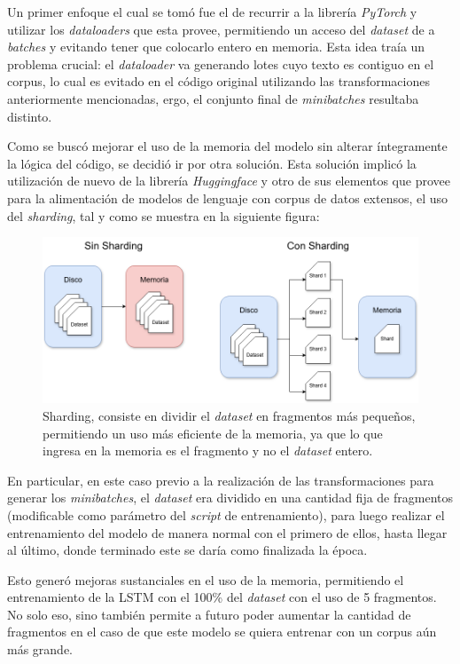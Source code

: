 Un primer enfoque el cual se tomó fue el de recurrir a la librería \textit{PyTorch} y utilizar los \textit{dataloaders} que esta provee, permitiendo un acceso del \textit{dataset} de a \textit{batches} y evitando tener que colocarlo entero en memoria. Esta idea traía un problema crucial: el \textit{dataloader} va generando lotes cuyo texto es contiguo en el corpus, lo cual es evitado en el código original utilizando las transformaciones anteriormente mencionadas, ergo, el conjunto final de \textit{minibatches} resultaba distinto.

Como se buscó mejorar el uso de la memoria del modelo sin alterar íntegramente la lógica del código, se decidió ir por otra solución. Esta solución implicó la utilización de nuevo de la librería \textit{Huggingface} y otro de sus elementos que provee para la alimentación de modelos de lenguaje con corpus de datos extensos, el uso del \textit{sharding}, tal y como se muestra en la siguiente figura:

\begin{figure}[H]
    \centering
    \includegraphics[width=1\textwidth]{imagenes/sharding.png}
    \caption{Sharding, consiste en dividir el \textit{dataset} en fragmentos más pequeños, permitiendo un uso más eficiente de la memoria, ya que lo que ingresa en la memoria es el fragmento y no el \textit{dataset} entero.}
    \label{fig:sharding}
\end{figure}

En particular, en este caso previo a la realización de las transformaciones para generar los \textit{minibatches}, el \textit{dataset} era dividido en una cantidad fija de fragmentos (modificable como parámetro del \textit{script} de entrenamiento), para luego realizar el entrenamiento del modelo de manera normal con el primero de ellos, hasta llegar al último, donde terminado este se daría como finalizada la época.

Esto generó mejoras sustanciales en el uso de la memoria, permitiendo el entrenamiento de la LSTM con el 100\% del \textit{dataset} con el uso de 5 fragmentos. No solo eso, sino también permite a futuro poder aumentar la cantidad de fragmentos en el caso de que este modelo se quiera entrenar con un corpus aún más grande.

